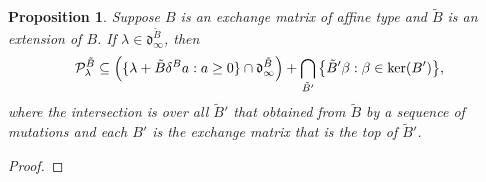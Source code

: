 \documentclass{amsart}
\newtheorem{proposition}{Proposition}[section]
\theoremstyle{definition}
\theoremstyle{remark}
\numberwithin{equation}{section}
\newcommand{\reals}{\mathbb R}
\newcommand{\set}[1]{{\lbrace #1 \rbrace}}
\newcommand{\sett}[1]{{\bigl\lbrace #1 \bigr\rbrace}}
\newcommand{\F}{{\mathcal F}}
\newcommand{\0}{{\mathbf{0}}}
\newcommand{\kk}{{\boldsymbol{k}}}
\newcommand{\tB}{{\tilde{B}}}
\newcommand{\BB}{\mathbf{B}}
\renewcommand{\P}{\mathcal{P}}
\renewcommand{\d}{{\mathfrak d}}
\begin{document}
\begin{proposition}\label{lots of kernels}
Suppose $B$ is an exchange matrix of affine type and $\tB$ is an extension of $B$.
If $\lambda\in\d_\infty^\tB$, then 
\[\P^\tB_{\lambda}\subseteq\Bigl(\set{\lambda+\tB\delta^Ba:a\ge0}\cap\d_\infty^\tB\Bigr)+\bigcap_{\tB'}\sett{\tB'\beta:\beta\in\ker(B')},\]
where the intersection is over all $\tB'$ that obtained from $\tB$ by a sequence of mutations and each $B'$ is the exchange matrix that is the top of $\tB'$.
\end{proposition}
\begin{proof}
%

\end{proof}
\end{document}
